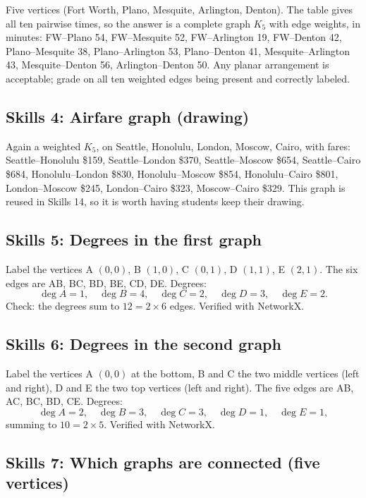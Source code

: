 Five vertices (Fort Worth, Plano, Mesquite, Arlington, Denton). The table gives all ten pairwise times, so the answer is a complete graph $K_5$ with edge weights, in minutes:
FW--Plano 54, FW--Mesquite 52, FW--Arlington 19, FW--Denton 42, Plano--Mesquite 38, Plano--Arlington 53, Plano--Denton 41, Mesquite--Arlington 43, Mesquite--Denton 56, Arlington--Denton 50.
Any planar arrangement is acceptable; grade on all ten weighted edges being present and correctly labeled.

\subsection*{Skills 4: Airfare graph (drawing)}

Again a weighted $K_5$, on Seattle, Honolulu, London, Moscow, Cairo, with fares:
Seattle--Honolulu \$159, Seattle--London \$370, Seattle--Moscow \$654, Seattle--Cairo \$684, Honolulu--London \$830, Honolulu--Moscow \$854, Honolulu--Cairo \$801, London--Moscow \$245, London--Cairo \$323, Moscow--Cairo \$329.
This graph is reused in Skills 14, so it is worth having students keep their drawing.

\subsection*{Skills 5: Degrees in the first graph}

Label the vertices A $(0,0)$, B $(1,0)$, C $(0,1)$, D $(1,1)$, E $(2,1)$. The six edges are AB, BC, BD, BE, CD, DE. Degrees:
\[
\deg A = 1,\quad \deg B = 4,\quad \deg C = 2,\quad \deg D = 3,\quad \deg E = 2.
\]
Check: the degrees sum to $12 = 2 \times 6$ edges. Verified with NetworkX.

\subsection*{Skills 6: Degrees in the second graph}

Label the vertices A $(0,0)$ at the bottom, B and C the two middle vertices (left and right), D and E the two top vertices (left and right). The five edges are AB, AC, BC, BD, CE. Degrees:
\[
\deg A = 2,\quad \deg B = 3,\quad \deg C = 3,\quad \deg D = 1,\quad \deg E = 1,
\]
summing to $10 = 2 \times 5$. Verified with NetworkX.

\subsection*{Skills 7: Which graphs are connected (five vertices)}

